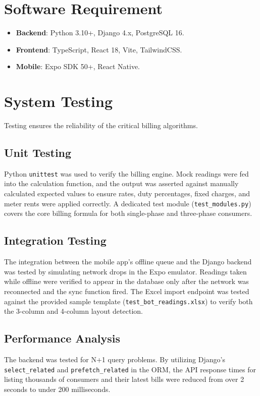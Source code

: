 \documentclass[12pt, a4paper, onecolumn]{report}
\begin{document}
\section{Software Requirement}
\begin{itemize}
    \item \textbf{Backend}: Python 3.10+, Django 4.x, PostgreSQL 16.
    \item \textbf{Frontend}: TypeScript, React 18, Vite, TailwindCSS.
    \item \textbf{Mobile}: Expo SDK 50+, React Native.
\end{itemize}

\section{System Testing}
Testing ensures the reliability of the critical billing algorithms.

\subsection{Unit Testing}
Python \texttt{unittest} was used to verify the billing engine. Mock readings were fed into the calculation function, and the output was asserted against manually calculated expected values to ensure rates, duty percentages, fixed charges, and meter rents were applied correctly. A dedicated test module (\texttt{test\_modules.py}) covers the core billing formula for both single-phase and three-phase consumers.

\subsection{Integration Testing}
The integration between the mobile app's offline queue and the Django backend was tested by simulating network drops in the Expo emulator. Readings taken while offline were verified to appear in the database only after the network was reconnected and the sync function fired. The Excel import endpoint was tested against the provided sample template (\texttt{test\_bot\_readings.xlsx}) to verify both the 3-column and 4-column layout detection.

\subsection{Performance Analysis}
The backend was tested for N+1 query problems. By utilizing Django's \texttt{select\_related} and \texttt{prefetch\_related} in the ORM, the API response times for listing thousands of consumers and their latest bills were reduced from over 2 seconds to under 200 milliseconds.
\end{document}
